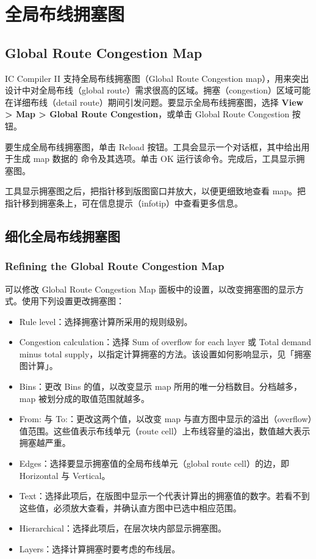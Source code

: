 \section{全局布线拥塞图}
\subsection*{Global Route Congestion Map}

IC Compiler II 支持全局布线拥塞图（Global Route Congestion map），用来突出设计中对全局布线（global route）需求很高的区域。拥塞（congestion）区域可能在详细布线（detail route）期间引发问题。要显示全局布线拥塞图，选择 \textbf{View > Map > Global Route Congestion}，或单击 Global Route Congestion 按钮。

要生成全局布线拥塞图，单击 Reload 按钮。工具会显示一个对话框，其中给出用于生成 map 数据的  命令及其选项。单击 OK 运行该命令。完成后，工具显示拥塞图。

工具显示拥塞图之后，把指针移到版图窗口并放大，以便更细致地查看 map。把指针移到拥塞条上，可在信息提示（infotip）中查看更多信息。

\subsection{细化全局布线拥塞图}
\subsubsection*{Refining the Global Route Congestion Map}

可以修改 Global Route Congestion Map 面板中的设置，以改变拥塞图的显示方式。使用下列设置更改拥塞图：
\begin{itemize}
  \item Rule level：选择拥塞计算所采用的规则级别。
  \item Congestion calculation：选择 Sum of overflow for each layer 或 Total demand minus total supply，以指定计算拥塞的方法。该设置如何影响显示，见「拥塞图计算」。
  \item Bins：更改 Bins 的值，以改变显示 map 所用的唯一分档数目。分档越多，map 被划分成的取值范围就越多。
  \item From: 与 To:：更改这两个值，以改变 map 与直方图中显示的溢出（overflow）值范围。这些值表示布线单元（route cell）上布线容量的溢出，数值越大表示拥塞越严重。
  \item Edges：选择要显示拥塞值的全局布线单元（global route cell）的边，即 Horizontal 与 Vertical。
  \item Text：选择此项后，在版图中显示一个代表计算出的拥塞值的数字。若看不到这些值，必须放大查看，并确认直方图中已选中相应范围。
  \item Hierarchical：选择此项后，在层次块内部显示拥塞图。
  \item Layers：选择计算拥塞时要考虑的布线层。
\end{itemize}


